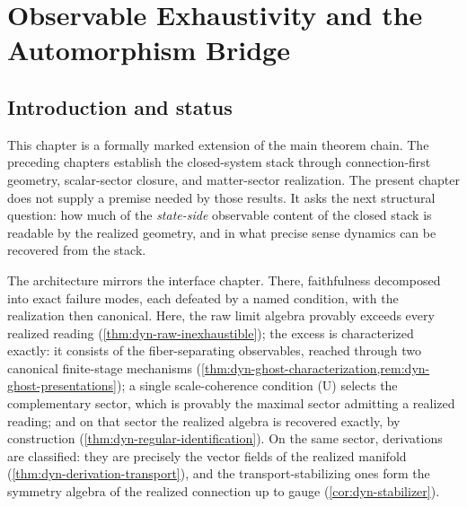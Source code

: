 \chapter{Observable Exhaustivity and the Automorphism Bridge}
\label{ch:dynamics-program}
\begin{chapterorientation}
\end{chapterorientation}
\section{Introduction and status}
\label{sec:dyn-intro}
This chapter is a formally marked extension of the main theorem chain.
The preceding chapters establish the closed-system stack through
connection-first geometry, scalar-sector closure, and matter-sector
realization. The present chapter does not supply a premise needed by
those results. It asks the next structural question: how much of the
\emph{state-side} observable content of the closed stack is readable by
the realized geometry, and in what precise sense dynamics can be
recovered from the stack.

The architecture mirrors the interface chapter. There, faithfulness
decomposed into exact failure modes, each defeated by a named
condition, with the realization then canonical. Here, the raw limit
algebra provably exceeds every realized reading
(\cref{thm:dyn-raw-inexhaustible}); the excess is characterized
exactly: it consists of the fiber-separating observables, reached
through two canonical finite-stage mechanisms
(\cref{thm:dyn-ghost-characterization,rem:dyn-ghost-presentations});
a single scale-coherence condition \textup{(U)} selects the
complementary sector, which is provably the maximal sector admitting
a realized reading; and on that sector the realized algebra is
recovered exactly, by construction
(\cref{thm:dyn-regular-identification}). On the same sector,
derivations are classified: they are precisely the vector fields of
the realized manifold (\cref{thm:dyn-derivation-transport}), and the
transport-stabilizing ones form the symmetry algebra of the realized
connection up to gauge (\cref{cor:dyn-stabilizer}).

